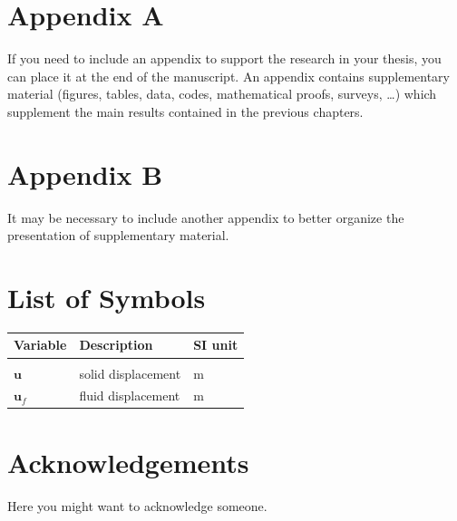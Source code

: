 \documentclass{config/PoliMi3i_thesis}
\begin{document}


\cleardoublepage
{} %
\appendix
\chapter{Appendix A}
If you need to include an appendix to support the research in your thesis, you can place it at the end of the manuscript.
An appendix contains supplementary material (figures, tables, data, codes, mathematical proofs, surveys, \dots)
which supplement the main results contained in the previous chapters.

\chapter{Appendix B}
It may be necessary to include another appendix to better organize the presentation of supplementary material.


\listoffigures

\listoftables

\chapter*{List of Symbols} %
\begin{table}[H]
    \centering
    \begin{tabular}{lll}
        \textbf{Variable} & \textbf{Description} & \textbf{SI unit} \\\hline\\[-9px]
        $\bm{u}$          & solid displacement   & m                \\[2px]
        $\bm{u}_f$        & fluid displacement   & m                \\[2px]
    \end{tabular}
\end{table}

\chapter*{Acknowledgements}
Here you might want to acknowledge someone.

\cleardoublepage
\end{document}
